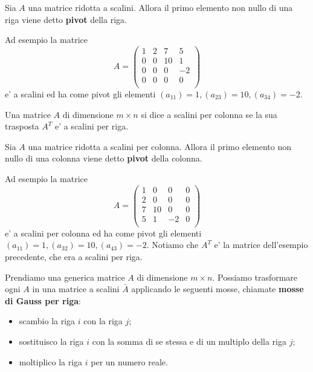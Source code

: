 \begin{definition}
    Sia $A$ una matrice ridotta a scalini. Allora il primo elemento non nullo di una riga viene detto \textbf{pivot} della riga.
\end{definition}

Ad esempio la matrice \[
    A = \begin{pmatrix}
        1   &2  &7  &5\\
        0   &0  &10 &1\\
        0   &0  &0  &-2\\
        0   &0  &0  &0\\
    \end{pmatrix}
\] e' a scalini ed ha come pivot gli elementi $(a_{11}) = 1, (a_{23}) = 10, (a_{34}) = -2$.

\begin{definition}
    Una matrice $A$ di dimensione $m \times n$ si dice a scalini per colonna se la sua trasposta $A^T$ e' a scalini per riga.
\end{definition}

\begin{definition}
    Sia $A$ una matrice ridotta a scalini per colonna. Allora il primo elemento non nullo di una colonna viene detto \textbf{pivot} della colonna.
\end{definition}

Ad esempio la matrice \[
    A = \begin{pmatrix}
        1   &0  &0  &0\\
        2   &0  &0  &0\\
        7   &10 &0  &0\\
        5   &1  &-2 &0\\
    \end{pmatrix}
\] e' a scalini per colonna ed ha come pivot gli elementi $(a_{11}) = 1, (a_{32}) = 10, (a_{43}) = -2$. Notiamo che $A^T$ e' la matrice dell'esempio precedente, che era a scalini per riga.

Prendiamo una generica matrice $A$ di dimensione $m \times n$. Possiamo trasformare ogni $A$ in una matrice a scalini $\bar{A}$ applicando le seguenti mosse, chiamate \textbf{mosse di Gauss per riga}:
\begin{itemize}
    \item scambio la riga $i$ con la riga $j$;
    \item sostituisco la riga $i$ con la somma di se stessa e di un multiplo della riga $j$;
    \item moltiplico la riga $i$ per un numero reale.
\end{itemize}

